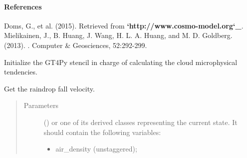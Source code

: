 \documentclass[letterpaper,10pt,english]{sphinxmanual}
\begin{document}
\begin{fulllineitems}
\begin{fulllineitems}
\begin{quote}
\begin{description}
\begin{itemize}
\end{itemize}


\end{description}\end{quote}
\paragraph{References}

Doms, G., et al. (2015).  Retrieved from {\color{red}\bfseries{}{}`http://www.cosmo-model.org{}`\_}.              Mielikainen, J., B. Huang, J. Wang, H. L. A. Huang, and M. D. Goldberg. (2013).                         . Computer \& Geosciences, 52:292-299.

\end{fulllineitems}


\begin{fulllineitems}
\label{\detokenize{api:parameterizations.slow_tendency_microphysics_kessler_wrf.SlowTendencyMicrophysicsKesslerWRF._stencil_tendency_initialize}}
Initialize the GT4Py stencil in charge of calculating the cloud microphysical tendencies.

\end{fulllineitems}


\begin{fulllineitems}
\label{\detokenize{api:parameterizations.slow_tendency_microphysics_kessler_wrf.SlowTendencyMicrophysicsKesslerWRF.get_raindrop_fall_velocity}}
Get the raindrop fall velocity.
\begin{quote}\begin{description}
\item[{Parameters}] \leavevmode
{} () \textendash{} 
{\hyperref[\detokenize{api:storages.grid_data.GridData}]{}} or one of its derived classes representing the current state.
It should contain the following variables:
\begin{itemize}
\item {} 
air\_density (unstaggered);


\end{itemize}
\end{description}
\end{quote}
\end{fulllineitems}
\end{fulllineitems}
\end{document}
